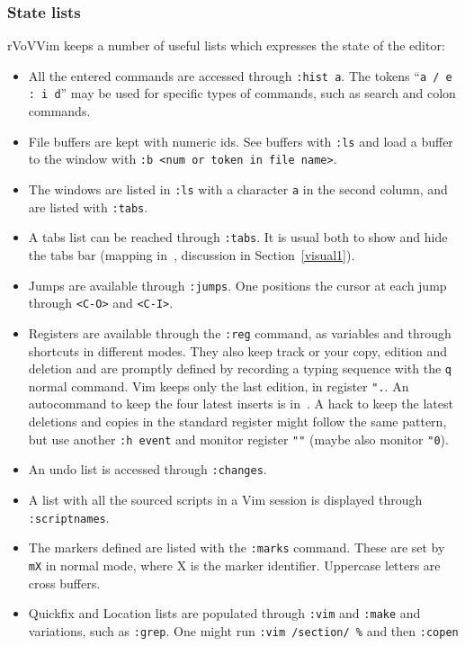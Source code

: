 \documentclass{article}
\newcommand{\ttt}[1] {
	\texttt{<#1>}}
\newcommand{\tttt}[1]{\texttt{#1}}
\begin{document}
\subsubsection{State lists}\label{state}
rVoVVim keeps a number of useful lists which expresses the state of the editor:
\begin{itemize}
	\item All the entered commands are accessed through \tttt{:hist a}. 
    The tokens ``\tttt{a / e : i d}'' may be used for specific types of commands, such
		as search and colon commands.
	\item File buffers are kept with numeric ids. See buffers with \tttt{:ls} and load a buffer to the window with \tttt{:b <num or token in file name>}.
  \item The windows are listed in \tttt{:ls} with a character \tttt{a} in the second column, and are listed with \tttt{:tabs}.
	\item A tabs list can be reached through \tttt{:tabs}.
		It is usual both to show and hide the tabs bar (mapping
    in~\cite{vimrc}, discussion in Section~\ref{visual1}).
	\item Jumps are available through \tttt{:jumps}.
		One positions the cursor at each jump through \ttt{C-O} and \ttt{C-I}.
  \item Registers are available through the \tttt{:reg} command, as variables and through shortcuts in different modes.
    They also keep track or your copy, edition and deletion and are promptly defined
    by recording a typing sequence with the \tttt{q} normal command.
    Vim keeps only the last edition, in register \tttt{".}.
    An autocommand to keep the four latest inserts is in~\cite{vimrc}.
    A hack to keep the latest deletions and copies in the standard register
    might follow the same pattern, but use another \tttt{:h event} and
    monitor register \tttt{""} (maybe also monitor \tttt{"0}).
	\item An undo list is accessed through \tttt{:changes}.
	\item A list with all the sourced scripts in a Vim session is displayed through \tttt{:scriptnames}.
	\item The markers defined are listed with the \tttt{:marks} command.
		These are set by \tttt{mX} in normal mode, where X is the marker identifier.
		Uppercase letters are cross buffers.
	\item Quickfix and Location lists are populated through \tttt{:vim} and \tttt{:make}
		and variations, such as \tttt{:grep}.
		One might run \tttt{:vim /section/ \%} and then \tttt{:copen}

\end{itemize}
\end{document}
